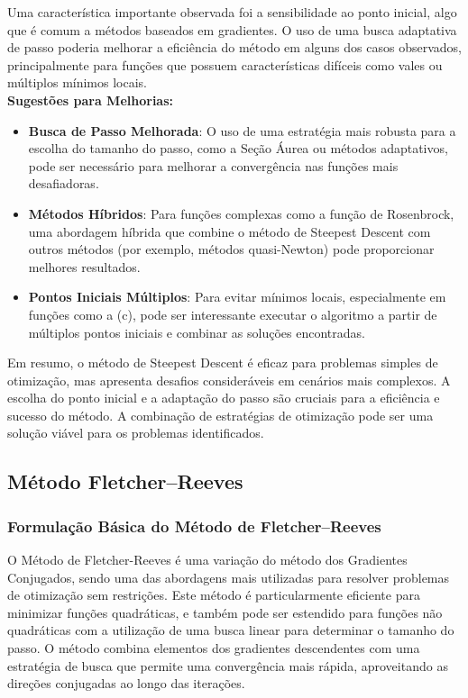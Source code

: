 \documentclass[a4paper, 12pt]{article}
\begin{document}
Uma característica importante observada foi a sensibilidade ao ponto inicial, algo que é comum a métodos baseados em gradientes. O uso de uma busca adaptativa de passo poderia melhorar a eficiência do método em alguns dos casos observados, principalmente para funções que possuem características difíceis como vales ou múltiplos mínimos locais.\\

\textbf{Sugestões para Melhorias:}
\begin{itemize}
    \item \textbf{Busca de Passo Melhorada}: O uso de uma estratégia mais robusta para a escolha do tamanho do passo, como a Seção Áurea ou métodos adaptativos, pode ser necessário para melhorar a convergência nas funções mais desafiadoras.
    \item \textbf{Métodos Híbridos}: Para funções complexas como a função de Rosenbrock, uma abordagem híbrida que combine o método de Steepest Descent com outros métodos (por exemplo, métodos quasi-Newton) pode proporcionar melhores resultados.
    \item \textbf{Pontos Iniciais Múltiplos}: Para evitar mínimos locais, especialmente em funções como a (c), pode ser interessante executar o algoritmo a partir de múltiplos pontos iniciais e combinar as soluções encontradas.
\end{itemize}

Em resumo, o método de Steepest Descent é eficaz para problemas simples de otimização, mas apresenta desafios consideráveis em cenários mais complexos. A escolha do ponto inicial e a adaptação do passo são cruciais para a eficiência e sucesso do método. A combinação de estratégias de otimização pode ser uma solução viável para os problemas identificados.








\newpage
\subsection{Método Fletcher–Reeves}

\subsubsection{Formulação Básica do Método de Fletcher–Reeves}

O Método de Fletcher-Reeves é uma variação do método dos Gradientes Conjugados, sendo uma das abordagens mais utilizadas para resolver problemas de otimização sem restrições. Este método é particularmente eficiente para minimizar funções quadráticas, e também pode ser estendido para funções não quadráticas com a utilização de uma busca linear para determinar o tamanho do passo. O método combina elementos dos gradientes descendentes com uma estratégia de busca que permite uma convergência mais rápida, aproveitando as direções conjugadas ao longo das iterações.
\end{document}
